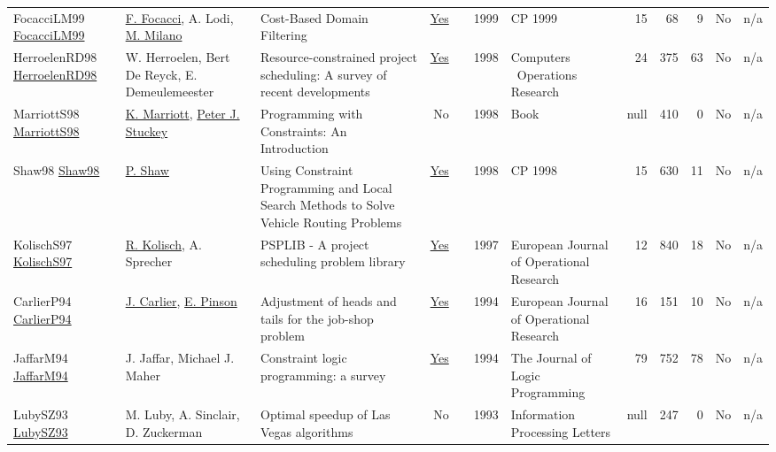 {\begin{longtable}{>{\raggedright\arraybackslash}p{3cm}>{\raggedright\arraybackslash}p{6cm}>{\raggedright\arraybackslash}p{6.5cm}rrrp{2.5cm}rrrrr}
FocacciLM99 \href{https://doi.org/10.1007/978-3-540-48085-3_14}{FocacciLM99} & \hyperref[auth:a782]{F. Focacci}, A. Lodi, \hyperref[auth:a144]{M. Milano} & Cost-Based Domain Filtering & \href{../works/FocacciLM99.pdf}{Yes} & \cite{FocacciLM99} & 1999 & CP 1999 & 15 & 68 & 9 & No & n/a\\
HerroelenRD98 \href{http://dx.doi.org/10.1016/s0305-0548(97)00055-5}{HerroelenRD98} & W. Herroelen, Bert De Reyck, E. Demeulemeester & Resource-constrained project scheduling: A survey of recent developments & \href{../works/HerroelenRD98.pdf}{Yes} & \cite{HerroelenRD98} & 1998 & Computers \  Operations Research & 24 & 375 & 63 & No & n/a\\
MarriottS98 \href{http://dx.doi.org/10.7551/mitpress/5625.001.0001}{MarriottS98} & \hyperref[auth:a694]{K. Marriott}, \hyperref[auth:a126]{Peter J. Stuckey} & Programming with Constraints: An Introduction & No & \cite{MarriottS98} & 1998 & Book & null & 410 & 0 & No & n/a\\
Shaw98 \href{https://doi.org/10.1007/3-540-49481-2_30}{Shaw98} & \hyperref[auth:a120]{P. Shaw} & Using Constraint Programming and Local Search Methods to Solve Vehicle Routing Problems & \href{../works/Shaw98.pdf}{Yes} & \cite{Shaw98} & 1998 & CP 1998 & 15 & 630 & 11 & No & n/a\\
KolischS97 \href{http://dx.doi.org/10.1016/s0377-2217(96)00170-1}{KolischS97} & \hyperref[auth:a443]{R. Kolisch}, A. Sprecher & PSPLIB - A project scheduling problem library & \href{../works/KolischS97.pdf}{Yes} & \cite{KolischS97} & 1997 & European Journal of Operational Research & 12 & 840 & 18 & No & n/a\\
CarlierP94 \href{http://dx.doi.org/10.1016/0377-2217(94)90379-4}{CarlierP94} & \hyperref[auth:a852]{J. Carlier}, \hyperref[auth:a853]{E. Pinson} & Adjustment of heads and tails for the job-shop problem & \href{../works/CarlierP94.pdf}{Yes} & \cite{CarlierP94} & 1994 & European Journal of Operational Research & 16 & 151 & 10 & No & n/a\\
JaffarM94 \href{http://dx.doi.org/10.1016/0743-1066(94)90033-7}{JaffarM94} & J. Jaffar, Michael J. Maher & Constraint logic programming: a survey & \href{../works/JaffarM94.pdf}{Yes} & \cite{JaffarM94} & 1994 & The Journal of Logic Programming & 79 & 752 & 78 & No & n/a\\
LubySZ93 \href{http://dx.doi.org/10.1016/0020-0190(93)90029-9}{LubySZ93} & M. Luby, A. Sinclair, D. Zuckerman & Optimal speedup of Las Vegas algorithms & No & \cite{LubySZ93} & 1993 & Information Processing Letters & null & 247 & 0 & No & n/a\\

\end{longtable}}
